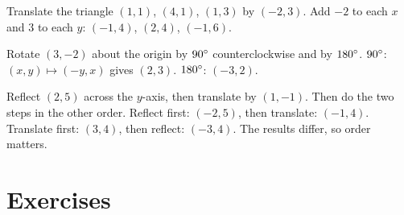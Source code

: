 \begin{example}
Translate the triangle $(1, 1)$, $(4, 1)$, $(1, 3)$ by $(-2, 3)$.
\solution Add $-2$ to each $x$ and $3$ to each $y$: $(-1, 4)$, $(2, 4)$, $(-1, 6)$.
\end{example}

\begin{example}
Rotate $(3, -2)$ about the origin by $90^\circ$ counterclockwise and by $180^\circ$.
\solution $90^\circ$: $(x, y) \mapsto (-y, x)$ gives $(2, 3)$. $180^\circ$: $(-3, 2)$.
\end{example}

\begin{example}
Reflect $(2, 5)$ across the $y$-axis, then translate by $(1, -1)$. Then do the two steps in the other order.
\solution Reflect first: $(-2, 5)$, then translate: $(-1, 4)$. Translate first: $(3, 4)$, then reflect: $(-3, 4)$. The results differ, so order matters.
\end{example}

\section{Exercises}

